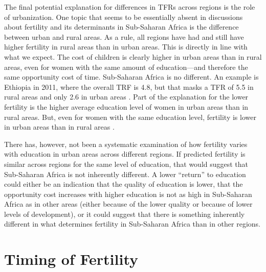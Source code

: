 \documentclass[letterpaper,12pt]{article}
\begin{document}
The final potential explanation for differences in TFRs across regions
is the role of urbanization. 
One topic that seems to be essentially absent in discussions about
fertility and its determinants in Sub-Saharan Africa is the difference
between urban and rural areas. 
As a rule, all regions have had and still have higher fertility in rural
areas than in urban areas. 
This is directly in line with what we expect. 
The cost of children is clearly higher in urban areas than in rural
areas, even for women with the same amount of education---and therefore
the same opportunity cost of time. 
Sub-Saharan Africa is no different. 
An example is Ethiopia in 2011, where the overall TRF is 4.8, but that
masks a TFR of 5.5 in rural areas and only 2.6 in urban areas
\citep{Central-Statistical-Agency/Ethiopia2012}. 
Part of the explanation for the lower fertility is the higher average
education level of women in urban areas than in rural areas. 
But, even for women with the same education level, fertility is lower in
urban areas than in rural areas \citep{Ainsworth1996}.

There has, however, not been a systematic examination of how fertility
varies with education in urban areas across different regions. 
If predicted fertility is similar across regions for the same level of
education, that would suggest that Sub-Saharan Africa is not inherently
different. 
A lower ``return'' to education could either be an indication that the
quality of education is lower, that the opportunity cost increases with
higher education is not as high in Sub-Saharan Africa as in other areas
(either because of the lower quality or because of lower levels of
development), or it could suggest that there is something inherently
different in what determines fertility in Sub-Saharan Africa than in
other regions.

\section{Timing of Fertility}\label{timing-of-fertility}
\end{document}
